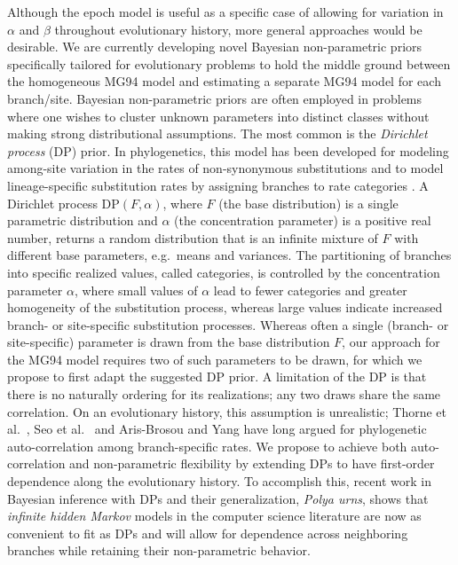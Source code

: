 Although the epoch model is useful as a specific case of allowing for variation in $\alpha$ and $\beta$ throughout evolutionary history, more general approaches would be desirable.
We are currently developing novel Bayesian non-parametric priors specifically tailored for evolutionary problems to hold the middle ground between the homogeneous MG94 model and estimating a separate MG94 model for each branch/site.
Bayesian non-parametric priors are often employed in problems where one wishes to cluster unknown parameters into distinct classes without making strong distributional assumptions.
The most common is the \emph{Dirichlet process} (DP) prior. 
In phylogenetics, this model has been developed for modeling among-site variation in the rates of non-synonymous substitutions \citep{Huelsenbeck2006} and to model lineage-specific substitution rates by assigning branches to rate categories \citep{Heath2012}.
A Dirichlet process DP$(F, \alpha)$, where $F$ (the base distribution) is a single parametric distribution and $\alpha$ (the concentration parameter) is a positive real number, returns a random distribution that is an infinite mixture of $F$ with different base parameters, e.g.~means and variances.
The partitioning of branches into specific realized values, called categories, is controlled by the concentration parameter $\alpha$, where small values of $\alpha$ lead to fewer categories and greater homogeneity of the substitution process, whereas large values indicate increased branch- or site-specific substitution processes.
Whereas often a single (branch- or site-specific) parameter is drawn from the base distribution $F$, our approach for the MG94 model requires two of such parameters to be drawn, for which we propose to first adapt the suggested DP prior.
A limitation of the DP is that there is no naturally ordering for its realizations; any two draws share the same correlation.  
On an evolutionary history, this assumption is unrealistic; Thorne et al.~\citep{Thorne1998}, Seo et al.~\citep{SKT04} and Aris-Brosou and Yang \citep{Aris-Brosou2002} have long argued for phylogenetic auto-correlation among branch-specific rates.
We propose to achieve both auto-correlation and non-parametric flexibility by extending DPs to have first-order dependence along the evolutionary history.  
To accomplish this, recent work in Bayesian inference with DPs and their generalization, \emph{Polya urns}, \citep{Guha2010} shows that \emph{infinite hidden Markov} models \citep{Beal2002} in the computer science literature are now as convenient to fit as DPs and will allow for dependence across neighboring branches while retaining their non-parametric behavior.

